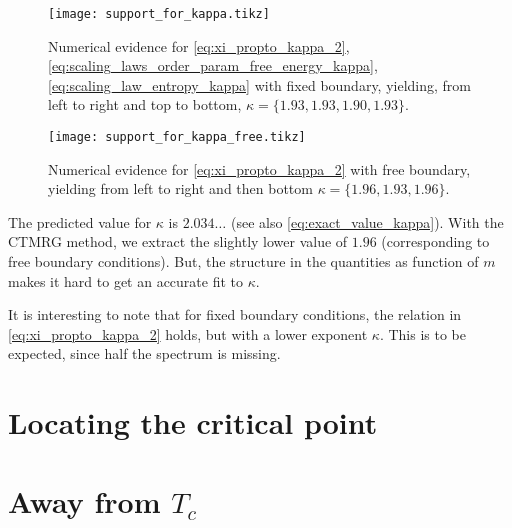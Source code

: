 \begin{figure}
  \texttt{[image: support\_for\_kappa.tikz]}
  \caption{Numerical evidence for \autoref{eq:xi_propto_kappa_2}, \autoref{eq:scaling_laws_order_param_free_energy_kappa},
  \autoref{eq:scaling_law_entropy_kappa} with fixed boundary, yielding, from left to right and top to bottom, $\kappa = \{ 1.93, 1.93, 1.90,
  1.93 \}$.}\label{fig:support_for_kappa}
\end{figure}

\begin{figure}
  \texttt{[image: support\_for\_kappa\_free.tikz]}
  \caption{Numerical evidence for \autoref{eq:xi_propto_kappa_2} with free boundary,
  yielding from left to right and then bottom $\kappa = \{ 1.96,
  1.93, 1.96 \}$.}\label{fig:support_for_kappa_free} \end{figure}

The predicted value for $\kappa$ \cite{pollmann2009theory} is $2.034\dots$ (see also \autoref{eq:exact_value_kappa}).
With the CTMRG method, we extract the slightly lower value of $1.96$ (corresponding to free boundary conditions).
But, the structure in the quantities as function of $m$ makes it hard to get an accurate fit to $\kappa$.

It is interesting to note that for fixed boundary conditions, the relation in \autoref{eq:xi_propto_kappa_2} holds,
but with a lower exponent $\kappa$. This is to be expected, since half the spectrum is missing.

\section{Locating the critical point}

\section{Away from $T_c$}
